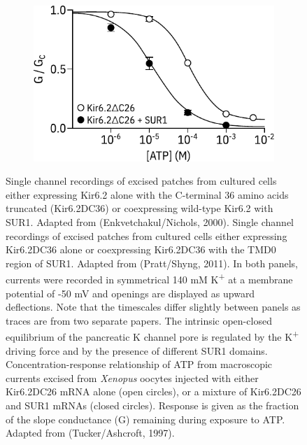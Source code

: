 \begin{figure}[h]
\begin{subfigure}[t]{0.45\textwidth}
	\end{subfigure}
	\hfill
	\begin{subfigure}[t]{0.45\textwidth}
		\caption{}\label{ch1fig:sur_shift}
		\centering
		\includegraphics[width=\textwidth]{tucker_sur_shift.pdf}
	\end{subfigure}
	\caption[SUR1 modulates Kir6.2 gating]{
		 Single channel recordings of excised patches from cultured cells either expressing Kir6.2 alone with the C-terminal 36 amino acids truncated (Kir6.2\textgreek{D}C36) or coexpressing wild-type Kir6.2 with SUR1.
		Adapted from (Enkvetchakul/Nichols, 2000).
		 Single channel recordings of excised patches from cultured cells either expressing Kir6.2\textgreek{D}C36 alone or coexpressing Kir6.2\textgreek{D}C36 with the TMD0 region of SUR1.
		Adapted from (Pratt/Shyng, 2011).
		In both panels, currents were recorded in symmetrical 140 mM K\textsuperscript{+} at a membrane potential of -50 mV and openings are displayed as upward deflections.
		Note that the timescales differ slightly between panels as traces are from two separate papers.
		 The intrinsic open-closed equilibrium of the pancreatic K\ATP{} channel pore is regulated by the K\textsuperscript{+} driving force and by the presence of different SUR1 domains.
		 Concentration-response relationship of ATP from macroscopic currents excised from \textit{Xenopus} oocytes injected with either Kir6.2\textgreek{D}C26 mRNA alone (open circles), or a mixture of Kir6.2\textgreek{D}C26 and SUR1 mRNAs (closed circles).
		Response is given as the fraction of the slope conductance (G) remaining during exposure to ATP.
		Adapted from (Tucker/Ashcroft, 1997).
	}
\end{figure}


